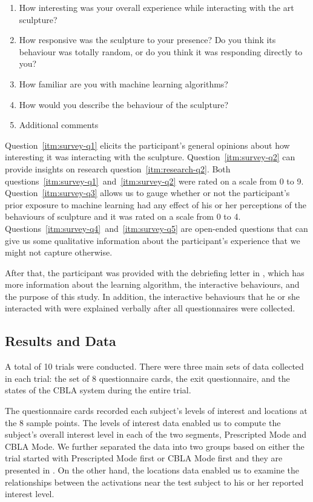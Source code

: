 \begin{enumerate}
	\item How interesting was your overall experience while interacting with the art 
	sculpture? \label{itm:survey-q1}
	\item How responsive was the sculpture to your presence?  Do you think its behaviour was totally random, or do you think it was responding directly to you? \label{itm:survey-q2}
	\item How familiar are you with machine learning algorithms? \label{itm:survey-q3}
	\item How would you describe the behaviour of the sculpture? \label{itm:survey-q4}
	\item Additional comments \label{itm:survey-q5}
\end{enumerate}

Question~\ref{itm:survey-q1} elicits the participant's general opinions about how interesting it was interacting with the sculpture. Question~\ref{itm:survey-q2} can provide insights on research question~\ref{itm:research-q2}. Both questions~\ref{itm:survey-q1}~and~\ref{itm:survey-q2} were rated on a scale from 0 to 9. Question~\ref{itm:survey-q3} allows us to gauge whether or not the participant's prior exposure to machine learning had any effect of his or her perceptions of the behaviours of sculpture and it was rated on a scale from 0 to 4. Questions~\ref{itm:survey-q4}~and~\ref{itm:survey-q5} are open-ended questions that can give us some qualitative information about the participant's experience that we might not capture otherwise.

After that, the participant was provided with the debriefing letter in , which has more information about the learning algorithm, the interactive behaviours, and the purpose of this study. In addition, the interactive behaviours that he or she interacted with were explained verbally after all questionnaires were collected.

\subsection{Results and Data}

A total of 10 trials were conducted. There were three main sets of data collected in each trial: the set of 8 questionnaire cards, the exit questionnaire, and the states of the CBLA system during the entire trial.

The questionnaire cards recorded each subject's levels of interest and locations at the 8 sample points. The levels of interest data enabled us to compute the subject's overall interest level in each of the two segments, Prescripted Mode and CBLA Mode. We further separated the data into two groups based on either the trial started with Prescripted Mode first or CBLA Mode first and they are presented in . On the other hand, the locations data enabled us to examine the relationships between the activations near the test subject to his or her reported interest level.

